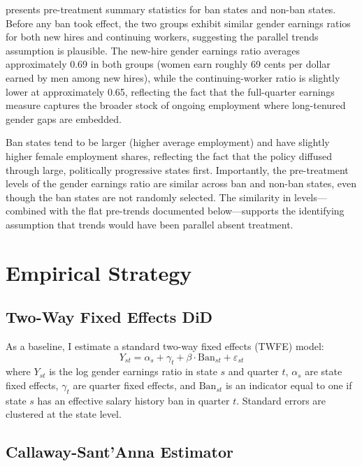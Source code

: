 \documentclass[12pt]{article}
\begin{document}
 presents pre-treatment summary statistics for ban states and non-ban states. Before any ban took effect, the two groups exhibit similar gender earnings ratios for both new hires and continuing workers, suggesting the parallel trends assumption is plausible. The new-hire gender earnings ratio averages approximately 0.69 in both groups (women earn roughly 69 cents per dollar earned by men among new hires), while the continuing-worker ratio is slightly lower at approximately 0.65, reflecting the fact that the full-quarter earnings measure captures the broader stock of ongoing employment where long-tenured gender gaps are embedded.

Ban states tend to be larger (higher average employment) and have slightly higher female employment shares, reflecting the fact that the policy diffused through large, politically progressive states first. Importantly, the pre-treatment levels of the gender earnings ratio are similar across ban and non-ban states, even though the ban states are not randomly selected. The similarity in levels---combined with the flat pre-trends documented below---supports the identifying assumption that trends would have been parallel absent treatment.




\section{Empirical Strategy}\label{sec:strategy}

\subsection{Two-Way Fixed Effects DiD}

As a baseline, I estimate a standard two-way fixed effects (TWFE) model:
\begin{equation}\label{eq:twfe}
  Y_{st} = \alpha_s + \gamma_t + \beta \cdot \text{Ban}_{st} + \varepsilon_{st}
\end{equation}
where $Y_{st}$ is the log gender earnings ratio in state $s$ and quarter $t$, $\alpha_s$ are state fixed effects, $\gamma_t$ are quarter fixed effects, and $\text{Ban}_{st}$ is an indicator equal to one if state $s$ has an effective salary history ban in quarter $t$. Standard errors are clustered at the state level.

\subsection{Callaway-Sant'Anna Estimator}
\end{document}
